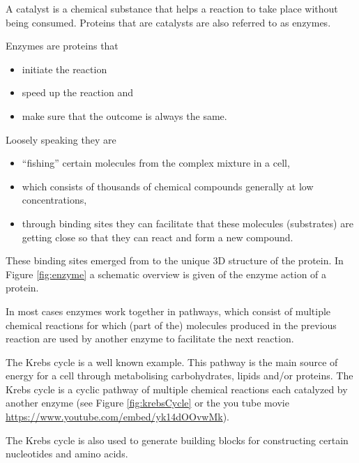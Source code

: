 \documentclass[
  11pt,
]{book}
\providecommand{\tightlist}{%
  \setlength{\itemsep}{0pt}\setlength{\parskip}{0pt}}
\begin{document}
A catalyst is a chemical substance that helps a reaction to take place without being consumed. Proteins that are catalysts are also referred to as enzymes.

Enzymes are proteins that

\begin{itemize}
\tightlist
\item
  initiate the reaction
\item
  speed up the reaction and
\item
  make sure that the outcome is always the same.
\end{itemize}

Loosely speaking they are

\begin{itemize}
\tightlist
\item
  ``fishing'' certain molecules from the complex mixture in a cell,
\item
  which consists of thousands of chemical compounds generally at low concentrations,
\item
  through binding sites they can facilitate that these molecules (substrates) are getting close so that they can react and form a new compound.
\end{itemize}

These binding sites emerged from to the unique 3D structure of the protein. In Figure \ref{fig:enzyme} a schematic overview is given of the enzyme action of a protein.

In most cases enzymes work together in pathways, which consist of multiple chemical reactions for which (part of the) molecules produced in the previous reaction are used by another enzyme to facilitate the next reaction.

The Krebs cycle is a well known example. This pathway is the main source of energy for a cell through metabolising carbohydrates, lipids and/or proteins. The Krebs cycle is a cyclic pathway of multiple chemical reactions each catalyzed by another enzyme (see Figure \ref{fig:krebsCycle} or the you tube movie \url{https://www.youtube.com/embed/yk14dOOvwMk}).

The Krebs cycle is also used to generate building blocks for constructing certain nucleotides and amino acids.
\end{document}
